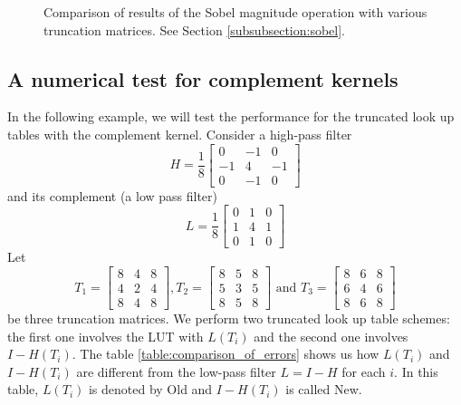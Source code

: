 \documentclass[12pt]{amsart}
\theoremstyle{definition}
\theoremstyle{remark}
\numberwithin{thm}{section}
\begin{document}
\begin{figure}[h]
\caption{Comparison of results of the Sobel magnitude operation with various truncation matrices. See Section \ref{subsubsection:sobel}.}
\label{fig:german_sobel} 
\end{figure}
\subsection{A numerical test for complement kernels}
In the following example, we will test the performance for the truncated look up tables with the complement kernel. Consider a high-pass filter
$$H=
\frac{1}{8}
\begin{bmatrix}
0 & -1 & 0\\
-1 & 4 & -1\\
0 & -1 & 0
\end{bmatrix}$$
and its complement (a low pass filter)
$$L=
\frac{1}{8}
\begin{bmatrix}
0 & 1 & 0\\
1 & 4 & 1\\
0 & 1 & 0
\end{bmatrix}$$
Let $$
T_{1}=\left[
\begin{array}{ccc}
8 & 4 & 8 \\
4 & 2 & 4 \\
8 & 4 & 8
\end{array}
\right] ,T_{2}=\left[
\begin{array}{ccc}
8 & 5 & 8 \\
5 & 3 & 5 \\
8 & 5 & 8
\end{array}
\right] \mbox{ and }T_{3}=\left[
\begin{array}{ccc}
8 & 6 & 8 \\
6 & 4 & 6 \\
8 & 6 & 8
\end{array}
\right]
$$
be three truncation matrices. We perform two truncated look up table schemes: the first one involves the LUT with $L(T_i)$ and the second one involves $I-H(T_i)$. The table \ref{table:comparison_of_errors} shows us how $L(T_i)$ and $I-H(T_i)$ are different from the low-pass filter $L=I-H$ for each $i$. In this table, $L(T_i)$ is denoted by Old and $I-H(T_i)$ is called New. 
\end{document}
